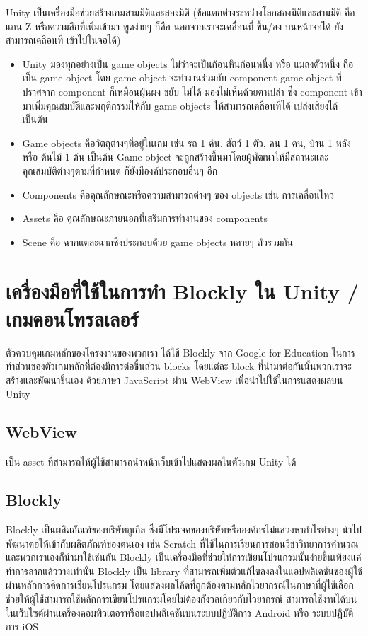 Unity เป็นเครื่องมือช่วยสร้างเกมสามมิติและสองมิติ 
(ข้อแตกต่างระหว่างโลกสองมิติและสามมิติ คือแกน Z หรือความลึกที่เพิ่มเข้ามา 
พูดง่ายๆ ก็คือ นอกจากเราจะเคลื่อนที่ ขึ้น/ลง บนหน้าจอได้ ยังสามารถเคลื่อนที่ 
เข้าไปในจอได้)~\cite{unth}
\begin{itemize}
  \item Unity มองทุกอย่างเป็น game objects ไม่ว่าจะเป็นก้อนหินก้อนหนึ่ง 
  หรือ แมลงตัวหนึ่ง ถือเป็น game object โดย game object 
  จะทำงานร่วมกับ component game object ที่ปราศจาก component 
  ก็เหมือนฝุ่นผง ขยับ ไม่ได้ มองไม่เห็นด้วยตาเปล่า ซึ่ง component 
  เข้ามาเพิ่มคุณสมบัติและพฤติกรรมให้กับ game objects ให้สามารถเคลื่อนที่ได้ 
  เปล่งเสียงได้ เป็นต้น
  \item Game objects คือวัตถุต่างๆที่อยู่ในเกม 
  เช่น รถ 1 คัน, สัตว์ 1 ตัว, คน 1 คน, บ้าน 1 หลัง หรือ ต้นไม้ 1 ต้น เป็นต้น 
  Game object จะถูกสร้างขึ้นมาโดยผู้พัฒนาให้มีสถานะและคุณสมบัติต่างๆตามที่กำหนด 
  ก็ยังมีองค์ประกอบอื่นๆ อีก
  \item Components คือคุณลักษณะหรือความสามารถต่างๆ ของ objects เช่น การเคลื่อนไหว
  \item Assets คือ คุณลักษณะภายนอกที่เสริมการทำงานของ components
  \item Scene คือ ฉากแต่ละฉากซึ่งประกอบด้วย game objects หลายๆ ตัวรวมกัน
\end{itemize}

\section{เครื่องมือที่ใช้ในการทำ Blockly ใน Unity / เกมคอนโทรลเลอร์}
ตัวควบคุมเกมหลักของโครงงานของพวกเรา ได้ใช้ Blockly 
จาก Google for Education ในการทำส่วนของตัวเกมหลักที่ต้องมีการต่อชิ้นส่วน 
blocks โดยแต่ละ block ที่นำมาต่อกันนั้นพวกเราจะสร้างและพัฒนาขึ้นเอง ด้วยภาษา 
JavaScript ผ่าน WebView เพื่อนำไปใช้ในการแสดงผลบน Unity

\subsection{WebView}
เป็น asset ที่สามารถให้ผู้ใช้สามารถนำหน้าเว็บเข้าไปแสดงผลในตัวเกม Unity ได้~\cite{unw}

\subsection{Blockly}
Blockly เป็นผลิตภัณฑ์ของบริษัทกูเกิล ซึ่งมีโปรเจคของบริษัทหรือองค์กรไม่แสวงหากำไรต่างๆ นำไปพัฒนาต่อให้เข้ากับผลิตภัณฑ์ของตนเอง เช่น Scratch ที่ใช้ในการเรียนการสอนวิชาวิทยาการคำนวณ
และพวกเราเองก็นำมาใช้เช่นกัน Blockly 
เป็นเครื่องมือที่ช่วยให้การเขียนโปรแกรมนั้นง่ายขึ้นเพียงแค่ทำการลากแล้ววางเท่านั้น
Blockly เป็น library ที่สามารถเพิ่มตัวแก้ไขลงลงในแอปพลิเคชันของผู้ใช้ผ่านหลักการคิดการเขียนโปรแกรม
โดยแสดงผลโค้ดที่ถูกต้องตามหลักไวยากรณ์ในภาษาที่ผู้ใช้เลือก 
ช่วยให้ผู้ใช้สามารถใช้หลักการเขียนโปรแกรมโดยไม่ต้องกังวลเกี่ยวกับไวยากรณ์ 
สามารถใช้งานได้บนในเว็บไซต์ผ่านเครื่องคอมพิวเตอรหรือแอปพลิเคชันบนระบบปฏิบัติการ Android หรือ ระบบปฏิบัติการ iOS~\cite{blc}


